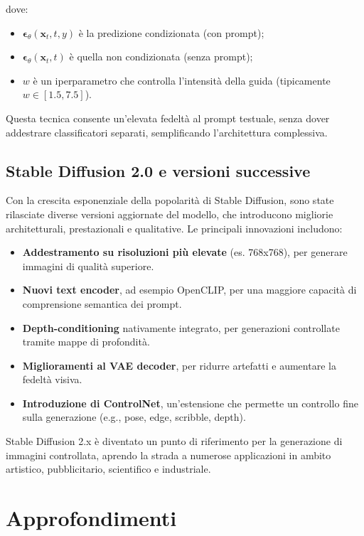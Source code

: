 dove:
\begin{itemize}
    \item $\boldsymbol{\epsilon}_\theta(\mathbf{x}_t, t, y)$ è la predizione condizionata (con prompt);
    \item $\boldsymbol{\epsilon}_\theta(\mathbf{x}_t, t)$ è quella non condizionata (senza prompt);
    \item $w$ è un iperparametro che controlla l'intensità della guida (tipicamente $w \in [1.5, 7.5]$).
\end{itemize}
Questa tecnica consente un'elevata fedeltà al prompt testuale, senza dover addestrare classificatori separati, semplificando l’architettura complessiva.

\subsection{Stable Diffusion 2.0 e versioni successive}

Con la crescita esponenziale della popolarità di Stable Diffusion, sono state rilasciate diverse versioni aggiornate del modello, che introducono migliorie architetturali, prestazionali e qualitative. Le principali innovazioni includono:

\begin{itemize}
    \item \textbf{Addestramento su risoluzioni più elevate} (es. 768x768), per generare immagini di qualità superiore.
    \item \textbf{Nuovi text encoder}, ad esempio OpenCLIP, per una maggiore capacità di comprensione semantica dei prompt.
    \item \textbf{Depth-conditioning} nativamente integrato, per generazioni controllate tramite mappe di profondità.
    \item \textbf{Miglioramenti al VAE decoder}, per ridurre artefatti e aumentare la fedeltà visiva.
    \item \textbf{Introduzione di ControlNet}, un'estensione che permette un controllo fine sulla generazione (e.g., pose, edge, scribble, depth).
\end{itemize}

Stable Diffusion 2.x è diventato un punto di riferimento per la generazione di immagini controllata, aprendo la strada a numerose applicazioni in ambito artistico, pubblicitario, scientifico e industriale.

\section*{Approfondimenti}

